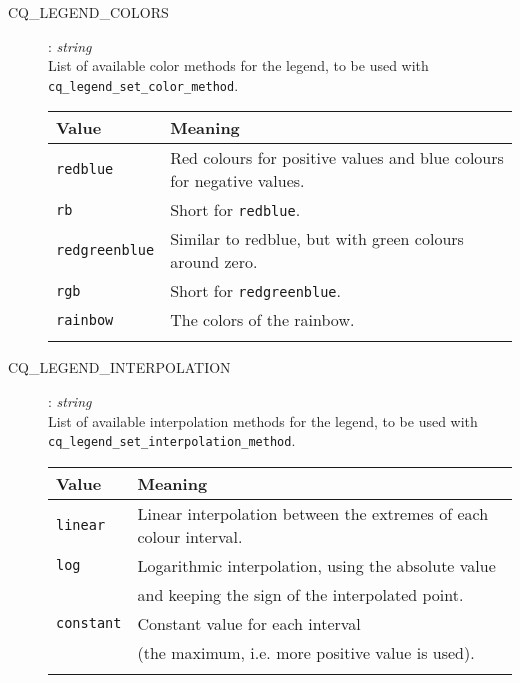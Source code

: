 \documentclass[a4paper,notitlepage,11pt]{article}
\begin{document}
\begin{description}
\item[CQ\_LEGEND\_COLORS]: \textit{string}\\ 
  List of available color methods for the legend, to be used with \texttt{cq\_legend\_set\_color\_method}.\\
  \begin{tabular}{ll}
    \\
    \hline\hline
    Value&Meaning\\
    \hline
    \texttt{redblue}&Red colours for positive values and blue colours for negative values.\\
    \texttt{rb}&Short for \texttt{redblue}.\\
    \texttt{redgreenblue}&Similar to redblue, but with green colours around zero.\\
    \texttt{rgb}&Short for \texttt{redgreenblue}.\\
    \texttt{rainbow}&The colors of the rainbow.\\
    \hline\hline
    \\
  \end{tabular}

\item[CQ\_LEGEND\_INTERPOLATION]: \textit{string}\\
  List of available interpolation methods for the legend, to be used with \\
  \texttt{cq\_legend\_set\_interpolation\_method}.\\
  \begin{tabular}{ll}
    \\
    \hline\hline
    Value&Meaning\\
    \hline
    \texttt{linear}&Linear interpolation between the extremes of each colour interval.\\
    \texttt{log}&Logarithmic interpolation, using the absolute value \\&and keeping the sign of the interpolated point.\\
    \texttt{constant}&Constant value for each interval\\&(the maximum, i.e. more positive value is used).\\
    \hline\hline
    \\
  \end{tabular}
 

\end{description}
\end{document}
